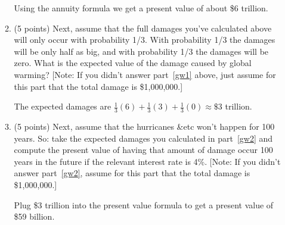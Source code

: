 \documentclass{article}
\newcommand{\myitem}{\item (5 points)\ }
\begin{document}
\begin{enumerate}
\begin{enumerate}
\begin{KEY}
Using the annuity formula we get a present value of about \$6 trillion.
\end{KEY}



    \item \begin{EXAM} (5 points) Next, assume that the full damages you've calculated above will only occur with probability 1/3. With probability 1/3 the damages will be only half as big, and with probability 1/3 the damages will be zero. What is the expected value of the damage caused by global warming? [Note: If you didn't answer part~\ref{gw1} above, just assume for this part that the total damage is \$1,000,000.] \label{gw2} \vspace{1.5in} \end{EXAM}

\begin{KEY}
The expected damages are $\frac{1}{3}(6) + \frac{1}{3}(3) +
\frac{1}{3}(0) \approx \$3$ trillion.
\end{KEY}



    \item \begin{EXAM} (5 points) Next, assume that the hurricanes \&etc won't happen for 100 years. So: take the expected damages you calculated in part~\ref{gw2} and compute the present value of having that amount of damage occur 100 years in the future if the relevant interest rate is 4\%. [Note: If you didn't answer part~\ref{gw2}, assume for this part that the total damage is \$1,000,000.] \vspace{1.5in} \end{EXAM}

\begin{KEY}
Plug \$3 trillion into the present value formula to get a present
value of \$59 billion.
\end{KEY}


    \end{enumerate}




\begin{comment}
\item Consider a cake-cutting game in which ``Mom" has five ounces of cake to divide between two children, each of whom has as his or her sole objective the desire for as much cake as possible.
    \begin{enumerate}
    \myitem Imagine that Mom decides to use the following 2-period game to allocate the cake: In round 1 there are five ounces of cake, and Player 1 makes a take-it-or-leave-it offer to Player 2. If Player 2 accepts, the game ends and the players divide and eat the cake; if Player 2 rejects, Mom eats two ounces of cake and the game moves to round 2. In round 2 (if there is one) there are three ounces of cake, and Player 2 makes a take-it-or-leave-it offer to Player 1. If Player 1 accepts, the game ends and the players divide and eat the three ounces of cake; if Player 1 rejects, the game ends and both players get nothing.


\end{comment}
\end{enumerate}
\end{document}
